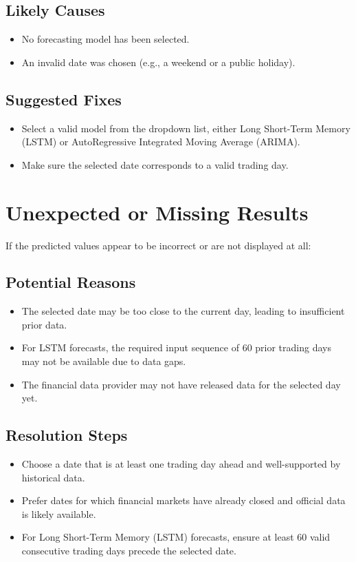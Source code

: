 \subsection{Likely Causes}
\begin{itemize}
	\item No forecasting model has been selected.
	\item An invalid date was chosen (e.g., a weekend or a public holiday).
\end{itemize}

\subsection{Suggested Fixes}
\begin{itemize}
	\item Select a valid model from the dropdown list, either Long Short-Term Memory (LSTM) or AutoRegressive Integrated Moving Average (ARIMA).
	\item Make sure the selected date corresponds to a valid trading day.
\end{itemize}

\section{Unexpected or Missing Results}
If the predicted values appear to be incorrect or are not displayed at all:

\subsection{Potential Reasons}
\begin{itemize}
	\item The selected date may be too close to the current day, leading to insufficient prior data.
	\item For LSTM forecasts, the required input sequence of 60 prior trading days may not be available due to data gaps.
	\item The financial data provider may not have released data for the selected day yet.
\end{itemize}

\subsection{Resolution Steps}
\begin{itemize}
	\item Choose a date that is at least one trading day ahead and well-supported by historical data.
	\item Prefer dates for which financial markets have already closed and official data is likely available.
	\item For Long Short-Term Memory (LSTM) forecasts, ensure at least 60 valid consecutive trading days precede the selected date.
\end{itemize}

